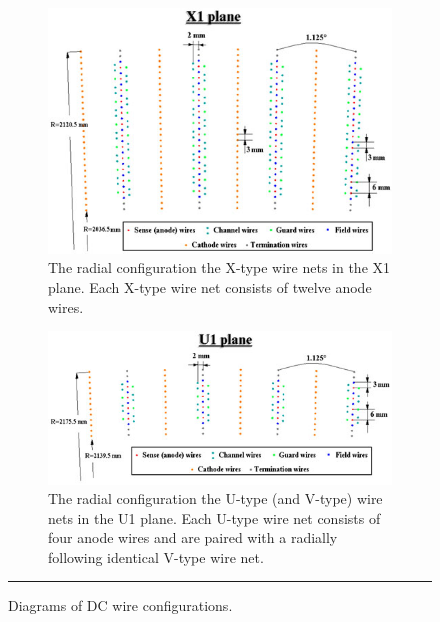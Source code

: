 \begin{figure}[H]
    \ContinuedFloat %
\begin{subfigure}[p]{1\textwidth}
  \centering
    \includegraphics[width=1\textwidth]{Figures/DCX1net.jpg}

  \caption{The radial configuration the X-type wire nets in the X1 plane. Each X-type wire net consists of twelve anode wires.}
  \label{fig:X1dcdiagram}
\end{subfigure}

\begin{subfigure}[p]{1\textwidth}
  \centering
    \includegraphics[width=1\textwidth]{Figures/DCU1net.jpg}
    
  \caption{The radial configuration the U-type (and V-type) wire nets in the U1 plane. Each U-type wire net consists of four anode wires and are paired with a radially following identical V-type wire net.}
  \label{fig:U1dcdiagram}
\end{subfigure}
\rule{35em}{0.5pt}
\caption[Diagrams of DC wire configurations.]{Diagrams of DC wire configurations.}
\label{fig:dcdiagram}
\end{figure}

